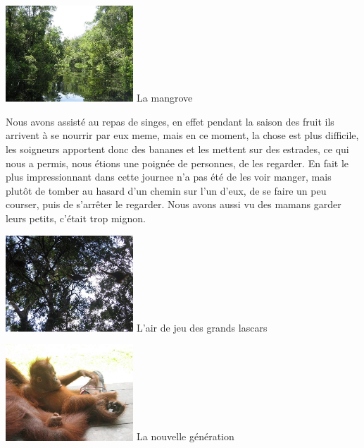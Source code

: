 \begin{multicols}{2}
\hspace*{-0.65cm}
\includegraphics[width=4.8cm]{articles/Borneo/1210332087kPql.jpg}
La mangrove

Nous avons assisté au repas de singes, en effet pendant la saison des fruit ils arrivent à se nourrir par eux meme, mais en ce moment, la chose est plus difficile, les soigneurs apportent donc des bananes et les mettent sur des estrades, ce qui nous a permis, nous étions une poignée de personnes, de les regarder. En fait le plus impressionnant dans cette journee n'a pas été de les voir manger, mais plutôt de tomber au hasard d'un chemin sur l'un d'eux, de se faire un peu courser, puis de s'arrêter le regarder. Nous avons aussi vu des mamans garder leurs petits, c'était trop mignon.

\hspace*{-0.65cm}
\includegraphics[width=4.8cm]{articles/Borneo/1210332096AngR.jpg}
L'air de jeu des grands lascars

\hspace*{-0.65cm}
\includegraphics[width=4.8cm]{articles/Borneo/1210332100Imld.jpg}
La nouvelle génération


\end{multicols}
